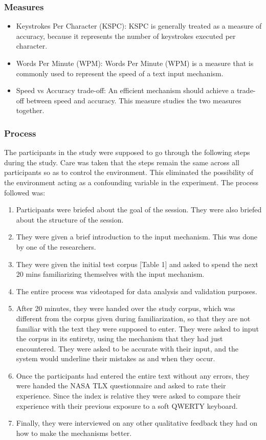 \subsubsection{Measures}
\begin{itemize}
	\item Keystrokes Per Character (KSPC): KSPC is generally treated as a measure of accuracy, because it
represents the number of keystrokes executed per character.
	\item Words Per Minute (WPM): Words Per Minute (WPM) is a measure that is commonly used to represent
the speed of a text input mechanism.
	\item Speed vs Accuracy trade-off: An efficient mechanism should achieve a trade-off between speed and accuracy. This measure studies the two measures together.
\end{itemize}
\subsubsection{Process}

The participants in the study were supposed to go through the following steps during the study. Care was taken that the steps remain the same across all participants so as to control the environment. This eliminated the possibility of the environment acting as a confounding variable in the experiment. The process followed was:

\begin{enumerate}
\item Participants were briefed about the goal of the session. They were also briefed about the structure of the session.
\item They were given a brief introduction to the input mechanism. This was done by one of the researchers.
\item They were given the initial test corpus [Table 1] and asked to spend the next 20 mins familiarizing themselves with the input mechanism.
\item The entire process was videotaped for data analysis and validation purposes.
\item After 20 minutes, they were handed over the study corpus, which was different from the corpus given during familiarization, so that they are not familiar with the text they were supposed to enter. They were asked to input the corpus in its entirety, using the mechanism that they had just encountered. They were asked to be accurate with their input, and the system would underline their mistakes as and when they occur.
\item Once the participants had entered the entire text without any errors, they were handed the NASA TLX questionnaire and asked to rate their experience. Since the index is relative they were asked to compare their experience with their previous exposure to a soft  QWERTY keyboard. 
\item Finally, they were interviewed on any other qualitative feedback they had on how to make the mechanisms better.
\end{enumerate}
	